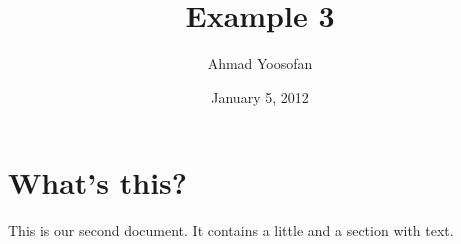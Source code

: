 \documentclass[a4paper, 11pt]{article}
\begin{document}
\title{Example 3}
\author{Ahmad Yoosofan}
\date{January 5, 2012}
\maketitle
\section{What's this?}
This is our second document. 
It contains a little and 
a section with text.
\end{document}
